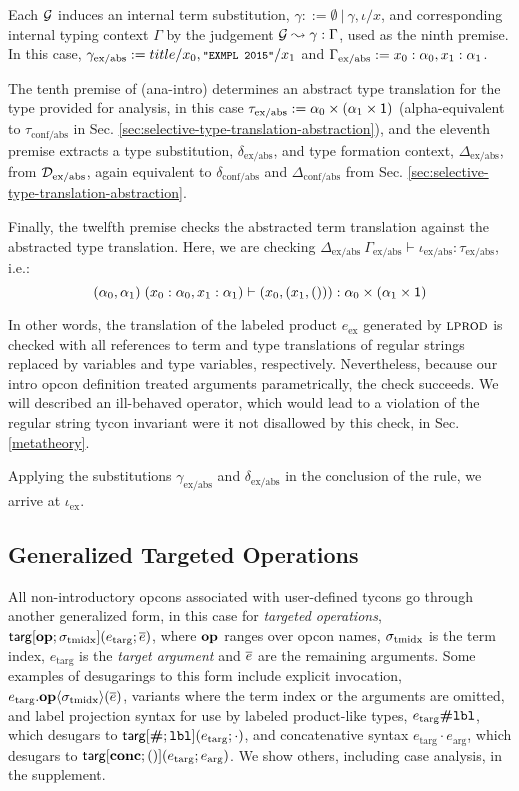 \documentclass[10pt,preprint]{sigplanconf}
\begin{document}
Each $\mathcal{G}$ induces an internal term substitution,  $\gamma ::= \emptyset ~|~ \gamma, \iota/x$, and corresponding internal typing context $\Gamma$ by the judgement $\mathcal{G} \leadsto \gamma : \Gamma$, used as the ninth premise. In this case, $\small
\gamma_\text{ex/abs} := title/x_0, \texttt{"EXMPL 2015"}/x_1$ and $\small\Gamma_\text{ex/abs} := x_0 : \alpha_0, x_1 : \alpha_1$. 

The tenth premise of (ana-intro) determines an abstract type translation for the type provided for analysis, in this case $\small\tau_\text{ex/abs} := \alpha_0 \times (\alpha_1 \times \kunit)$ (alpha-equivalent to $\tau_\text{conf/abs}$ in Sec. \ref{sec:selective-type-translation-abstraction}), and the eleventh premise extracts a type substitution, $\delta_\text{ex/abs}$, and type formation context, $\Delta_\text{ex/abs}$, from $\mathcal{D}_\text{ex/abs}$, again equivalent to $\delta_\text{conf/abs}$ and $\Delta_\text{conf/abs}$ from Sec. \ref{sec:selective-type-translation-abstraction}. 

Finally, the twelfth premise checks the abstracted term translation against the abstracted type translation. Here, we are checking $\Delta_\text{ex/abs}~\Gamma_\text{ex/abs} \vdash \iota_\text{ex/abs} : \tau_\text{ex/abs}$, i.e.: \[\small(\alpha_0, \alpha_1)~(x_0 : \alpha_0, x_1 : \alpha_1) \vdash (x_0, (x_1, ())) : \alpha_0 \times (\alpha_1 \times \kunit)
\]

In other words, the translation of the labeled product $e_\text{ex}$ generated by $\textsc{lprod}$ is checked with all references to term and type translations of regular strings replaced by variables and type variables, respectively. Nevertheless, because our intro opcon definition treated arguments parametrically, the check succeeds. We will described  an ill-behaved operator, which would lead to a violation of the regular string tycon  invariant were it not disallowed by this check,  in Sec. \ref{metatheory}.

Applying the substitutions $\gamma_\text{ex/abs}$ and $\delta_\text{ex/abs}$ in the conclusion of the rule, we arrive at $\iota_\text{ex}$.

\subsection{Generalized Targeted Operations} 
All non-introductory opcons associated with user-defined tycons go through another generalized form, in this case for \emph{targeted operations}, ${\sf targ}[\textbf{op}; \sigma_\text{tmidx}](e_\text{targ}; \overline{e})$, where $\textbf{op}$ ranges over opcon names, ${\sigma_\text{tmidx}}$ is the term index, $e_\text{targ}$ is the \emph{target argument} and $\overline{e}$ are the remaining arguments. Some examples of desugarings to this form include explicit invocation, $e_\text{targ}.\textbf{op}\langle\sigma_\text{tmidx}\rangle(\overline{e})$, variants where the term index or the arguments are omitted, and label projection syntax for use by labeled product-like types, $e_\text{targ}\textbf{\#}\texttt{lbl}$, which desugars to ${\sf targ}[\textbf{\#}; \texttt{lbl}](e_\text{targ}; \cdot)$, and concatenative syntax $e_\text{targ} \cdot e_\text{arg}$, which desugars to ${\sf targ}[\textbf{conc}; ()](e_\text{targ}; e_\text{arg})$. We show others, including case analysis, in the supplement.
\end{document}
